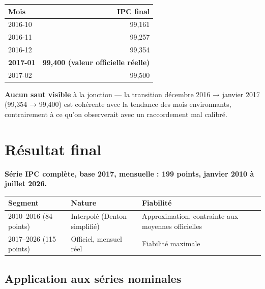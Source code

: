\documentclass[11pt,a4paper]{article}
\begin{document}
\begin{fichebox}
\begin{center}
\begin{tabular}{lr}
\toprule
\textbf{Mois} & \textbf{IPC final} \\
\midrule
2016-10 & 99,161 \\
2016-11 & 99,257 \\
2016-12 & 99,354 \\
\textbf{2017-01} & \textbf{99,400 (valeur officielle réelle)} \\
2017-02 & 99,500 \\
\bottomrule
\end{tabular}
\end{center}
\textbf{Aucun saut visible} à la jonction --- la transition décembre 2016 → janvier 2017 (99,354 → 99,400) est cohérente avec la tendance des mois environnants, contrairement à ce qu'on observerait avec un raccordement mal calibré.
\end{fichebox}

\section{Résultat final}

\begin{fichebox}
\textbf{Série IPC complète, base 2017, mensuelle : 199 points, janvier 2010 à juillet 2026.}

\begin{center}
\small
\begin{tabular}{lll}
\toprule
\textbf{Segment} & \textbf{Nature} & \textbf{Fiabilité} \\
\midrule
2010--2016 (84 points) & Interpolé (Denton simplifié) & Approximation, contrainte aux moyennes officielles \\
2017--2026 (115 points) & Officiel, mensuel réel & Fiabilité maximale \\
\bottomrule
\end{tabular}
\end{center}
\end{fichebox}

\subsection{Application aux séries nominales}
\end{document}
